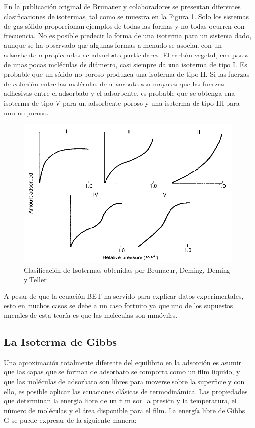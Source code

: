 \documentclass[11pt]{book}
\begin{document}
En la publicación original de Brunauer y colaboradores se presentan diferentes clasificaciones de isotermas, tal como se muestra en la Figura \ref{fig:Isoterma_BET}. Solo los sistemas de gas-sólido proporcionan ejemplos de todas las formas y no todas ocurren con frecuencia. No es posible predecir la forma de una isoterma para un sistema dado, aunque se ha observado que algunas formas a menudo se asocian con un adsorbente o propiedades de adsorbato particulares. El carbón vegetal, con poros de unas pocas moléculas de diámetro, casi siempre da una isoterma de tipo I. Es probable que un sólido no poroso produzca una isoterma de tipo II. Si las fuerzas de cohesión entre las moléculas de adsorbato son mayores que las fuerzas adhesivas entre el adsorbato y el adsorbente, es probable que se obtenga una isoterma de tipo V para un adsorbente poroso y una isoterma de tipo III para uno no poroso.

\begin{figure}[H]
    \centering
    \includegraphics[width = 12cm]{img/adsorcion/IsotermaBET.PNG}
    \caption{Clasificación de Isotermas obtenidas por Brunaeur, Deming, Deming y Teller}
    \label{fig:Isoterma_BET}
\end{figure}

A pesar de que la ecuación BET ha servido para explicar datos experimentales, esto en muchos casos se debe a un caso fortuito ya que uno de los supuestos iniciales de esta teoría es que las moléculas son inmóviles.

\subsection{La Isoterma de Gibbs}

Una aproximación totalmente diferente del equilibrio en la adsorción es asumir que las capas que se forman de adsorbato se comporta como un film líquido, y que las moléculas de adsorbato son libres para moverse sobre la superficie y con ello, es posible aplicar las ecuaciones clásicas de termodinámica. Las propiedades que determinan la energía libre de un film son la presión y la temperatura, el número de moléculas y el área disponible para el film. La energía libre de Gibbs G se puede expresar de la siguiente manera:
\end{document}
